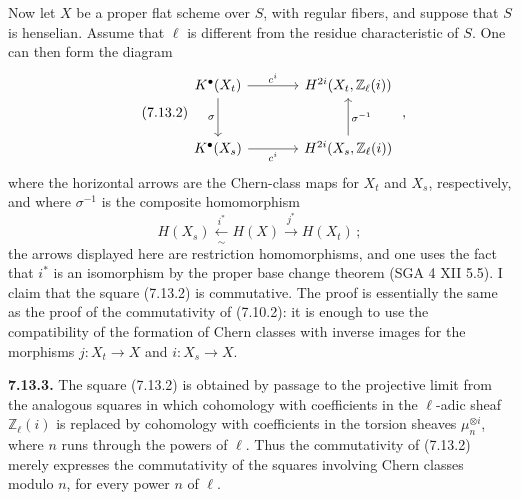 Now let $X$ be a proper flat scheme over $S$, with regular fibers, and suppose
that $S$ is henselian. Assume that $\ell$ is different from the residue
characteristic of $S$. One can then form the diagram
\begin{equation}\tag{7.13.2}
\begin{tikzcd}[column sep=large,row sep=large]
K^\bullet(X_t) \arrow[r,"c^i"] \arrow[d,"\sigma"'] &
H^{2i}(X_t,\mathbb Z_\ell(i))\\
K^\bullet(X_s) \arrow[r,"c^i"'] &
H^{2i}(X_s,\mathbb Z_\ell(i)) \arrow[u,"\sigma^{-1}"']
\end{tikzcd}
\;,
\end{equation}
where the horizontal arrows are the Chern-class maps for $X_t$ and $X_s$,
respectively, and where $\sigma^{-1}$ is the composite homomorphism
\[
H(X_s)\xleftarrow[\sim]{i^*}H(X)\xrightarrow{j^*}H(X_t)\,;
\]
the arrows displayed here are restriction homomorphisms, and one uses the
fact that $i^*$ is an isomorphism by the proper base change theorem
(SGA 4 XII 5.5). I claim that the square (7.13.2) is commutative. The proof is
essentially the same as the proof of the commutativity of (7.10.2): it is
enough to use the compatibility of the formation of Chern classes with
inverse images for the morphisms $j:X_t\to X$ and $i:X_s\to X$.

\textbf{7.13.3.}
The square (7.13.2) is obtained by passage to the projective limit from the
analogous squares in which cohomology with coefficients in the $\ell$-adic
sheaf $\mathbb Z_\ell(i)$ is replaced by cohomology with coefficients in the
torsion sheaves $\mu_n^{\otimes i}$, where $n$ runs through the powers of
$\ell$. Thus the commutativity of (7.13.2) merely expresses the
commutativity of the squares involving Chern classes modulo $n$, for every
power $n$ of $\ell$.

